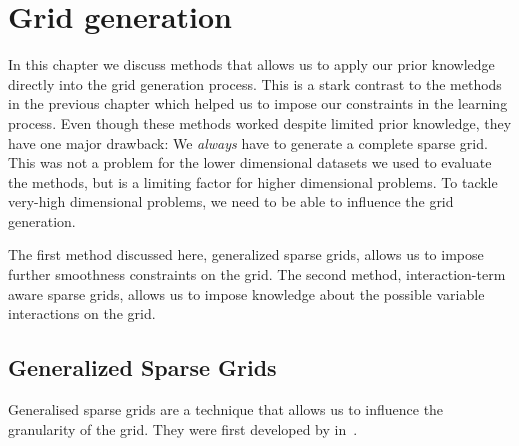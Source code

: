 \chapter{Grid generation}\label{cha:grid-gen}
In this chapter we discuss methods that allows us to apply our prior knowledge directly into the grid generation process.
This is a stark contrast to the methods in the previous chapter which helped us
to impose our constraints in the learning process.
Even though these methods worked despite limited prior knowledge, they have
one major drawback:
We \emph{always} have to generate a complete sparse grid.
This was not a problem for the lower dimensional datasets we used to evaluate
the methods, but is a limiting factor for higher dimensional problems.
To tackle very-high dimensional problems, we need to be able to influence the
grid generation.

The first method discussed here, generalized sparse grids, allows us to impose
further smoothness constraints on the grid.
The second method, interaction-term aware sparse grids, allows us to impose
knowledge about the possible variable interactions on the grid.

\section{Generalized Sparse Grids}\label{sec:generalised-sg}
Generalised sparse grids are a technique that allows us to influence the
granularity of the grid.
They were first developed by \citeauthor{optimizedApproxSpaces} in~\cite{optimizedApproxSpaces}.

